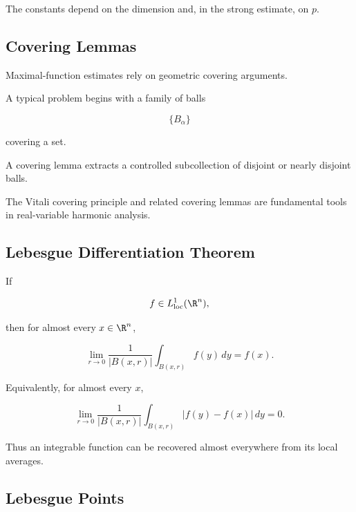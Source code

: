 The constants depend on the dimension and, in the strong estimate, on
\(p\).

\subsection{Covering Lemmas}
\label{subsec:covering-lemmas}

Maximal-function estimates rely on geometric covering arguments.

A typical problem begins with a family of balls

\[
\{B_\alpha\}
\]

covering a set.

A covering lemma extracts a controlled subcollection of disjoint or
nearly disjoint balls.

The Vitali covering principle and related covering lemmas are fundamental
tools in real-variable harmonic analysis.

\subsection{Lebesgue Differentiation Theorem}
\label{subsec:lebesgue-differentiation}

\begin{theorem}
If

\[
f\in L^1_{\mathrm{loc}}(\R^n),
\]

then for almost every \(x\in\R^n\),

\[
\boxed{
\lim_{r\to0}
\frac{1}{|B(x,r)|}
\int_{B(x,r)}
f(y)\,dy
=
f(x).
}
\]
\end{theorem}

Equivalently, for almost every \(x\),

\[
\boxed{
\lim_{r\to0}
\frac{1}{|B(x,r)|}
\int_{B(x,r)}
|f(y)-f(x)|\,dy
=
0.
}
\]

Thus an integrable function can be recovered almost everywhere from its
local averages.

\subsection{Lebesgue Points}
\label{subsec:lebesgue-points}

